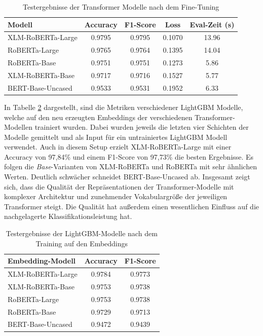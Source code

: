 \begin{table}[!ht]
\centering
\begin{tabular}{lcccc}
    \toprule
    \textbf{Modell} & \textbf{Accuracy} & \textbf{F1-Score} & \textbf{Loss} & \textbf{Eval-Zeit (s)} \\
    \midrule
    XLM-RoBERTa-Large & 0.9795 & 0.9795 & 0.1070 & 13.96 \\
    RoBERTa-Large     & 0.9765 & 0.9764 & 0.1395 & 14.04 \\
    RoBERTa-Base      & 0.9751 & 0.9751 & 0.1273 & 5.86 \\
    XLM-RoBERTa-Base  & 0.9717 & 0.9716 & 0.1527 & 5.77 \\
    BERT-Base-Uncased & 0.9533 & 0.9531 & 0.1952 & 6.33 \\
    \bottomrule
\end{tabular}
\caption{Testergebnisse der Transformer Modelle nach dem Fine-Tuning}
\label{tab:vergleich_der_transformer_modelle}
\end{table}

In Tabelle \ref{tab:vergleich_lightgbm_modelle} dargestellt, sind die Metriken verschiedener LightGBM Modelle, welche auf den neu erzeugten 
Embeddings der verschiedenen Transformer-Modellen trainiert wurden.
Dabei wurden jeweils die letzten vier Schichten der Modelle gemittelt und als Input für ein untrainiertes LightGBM Modell verwendet. 
Auch in diesem Setup erzielt XLM-RoBERTa-Large mit einer Accuracy von 97,84\% und einem F1-Score von 97,73\% die besten Ergebnisse. 
Es folgen die \textit{Base}-Varianten von XLM-RoBERTa und RoBERTa mit sehr ähnlichen Werten. Deutlich schwächer schneidet BERT-Base-Uncased ab. 
Insgesamt zeigt sich, dass die Qualität der Repräsentationen der Transformer-Modelle mit komplexer Architektur und zunehmender Vokabulargröße der jeweiligen Transformer steigt. 
Die Qualität hat außerdem einen wesentlichen Einfluss auf die nachgelagerte Klassifikationsleistung hat.

\begin{table}[!ht]
\centering
\begin{tabular}{lcc}
    \toprule
    \textbf{Embedding-Modell} & \textbf{Accuracy} & \textbf{F1-Score} \\
    \midrule
    XLM-RoBERTa-Large & 0.9784 & 0.9773 \\
    XLM-RoBERTa-Base  & 0.9753 & 0.9738 \\
    RoBERTa-Large     & 0.9753 & 0.9738 \\
    RoBERTa-Base      & 0.9729 & 0.9713 \\
    BERT-Base-Uncased & 0.9472 & 0.9439 \\
    \bottomrule
\end{tabular}
\caption{Testergebnisse der LightGBM-Modelle nach dem Training auf den Embeddings}
\label{tab:vergleich_lightgbm_modelle}
\end{table}

